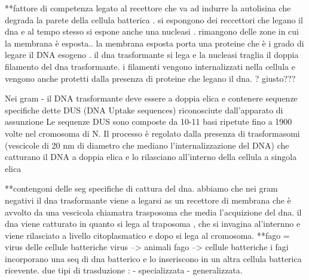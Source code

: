\documentclass[11pt]{book}
\begin{document}
**fattore di competenza legato al recettore che va ad indurre la autolisina che degrada la parete della cellula batterica . si espongono dei reccettori che legano il dna e al tempo stesso si espone anche una nucleasi . rimangono delle zone in cui la membrana è esposta.. la membrana esposta porta una proteine che è i grado di legare il DNA esogeno . il dna trasformante si lega e la nucleasi traglia il doppia filamento del dna trasformante. i filamenti vengono internalizzati nella cellula e vengono anche protetti dalla presenza di proteine che legano il dna. ? giusto???

Nei gram - il DNA trasformante deve essere a doppia elica e contenere sequenze specifiche dette DUS (DNA Uptake sequences) riconosciute dall’apparato di assunzione 
Le sequenze DUS sono composte da 10-11 basi ripetute fino a 1900 volte nel cromosoma di N. 
Il processo è regolato dalla presenza di trasformasomi (vescicole di 20 nm di diametro che mediano l’internalizzazione del DNA) che catturano il DNA a doppia elica 
e lo rilasciano all’interno della cellula a singola elica

**contengoni delle seg specifiche di cattura del dna. 
abbiamo che nei gram negativi il dna trasformante viene a legarsi as un recettore di membrana che è avvolto da una vescicola chiamatra trasposoma che media l'acquizione del dna.  il dna viene catturato in quanto si lega al traposoma , che si invagina al'internno e viene rilasciato a livello citoplasmatico e dopo si lega al cromosoma.
**fago = virus delle cellule batteriche  
virus --> animali
fago --> cellule batteriche
i fagi incorporano una seq di dna batterico e lo inseriscono in un altra cellula batterica ricevente. 
due tipi di trasduzione :
- specializzata  - generalizzata. 
\end{document}
